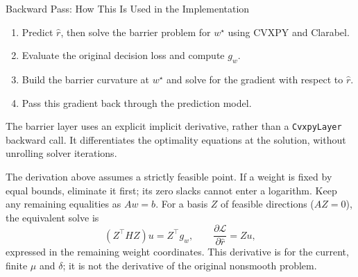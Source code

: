 \documentclass[aspectratio=169,xcolor=dvipsnames]{beamer}
\begin{document}
\begin{frame}{Backward Pass: How This Is Used in the Implementation}
    \small
    \begin{enumerate}
        \item Predict $\hat r$, then solve the barrier problem for
        $w^\star$ using CVXPY and Clarabel.
        \item Evaluate the original decision loss and compute $g_w$.
        \item Build the barrier curvature at $w^\star$ and solve for
        the gradient with respect to $\hat r$.
        \item Pass this gradient back through the prediction model.
    \end{enumerate}
    \medskip
    The barrier layer uses an explicit implicit derivative, rather than
    a \texttt{CvxpyLayer} backward call. It differentiates the optimality
    equations at the solution, without unrolling solver iterations.
    \medskip

    The derivation above assumes a strictly feasible point. If a weight
    is fixed by equal bounds, eliminate it first; its zero slacks cannot
    enter a logarithm. Keep any remaining equalities as $Aw=b$.
    For a basis $Z$ of feasible directions ($AZ=0$), the equivalent solve is
    \[
    (Z^\top HZ)u=Z^\top g_w,
    \qquad \frac{\partial\mathcal L}{\partial\hat r}=Zu,
    \]
    expressed in the remaining weight coordinates. This derivative is
    for the current, finite $\mu$ and $\delta$; it is not the derivative
    of the original nonsmooth problem.
\end{frame}













\end{document}
